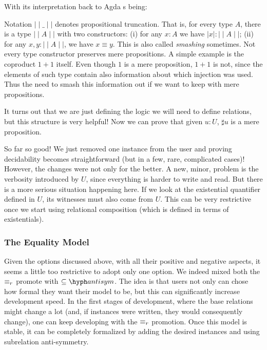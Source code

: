   
  With its interpretation back to Agda s being:
   
  
  Notation $\mid\mid\_\mid\mid$ denotes propositional truncation. That is, for every type $A$,
  there is a type $\mid\mid A \mid\mid$ with two constructors: (i) for any $x : A$ we have
  $\mid x \mid : \mid\mid A \mid\mid$; (ii) for any $x , y : \mid\mid A \mid\mid$, we have
  $x \equiv y$. This is also called \emph{smashing} sometimes. Not every type constructor 
  preserves mere propositions. A simple example is the coproduct
  $1 + 1$ itself. Even though $1$ is a mere proposition, $1 + 1$ is not, since the elements of such type
  contain also information about which injection was used. Thus the need to smash this information out
  if we want to keep with mere propositions.
  
  It turns out that we are just defining the logic we will need to define relations, but this
  structure is very helpful! Now we can prove that given $u : U$, $\sharp u$ is a mere proposition.
  
  
  So far so good! We just removed one instance from the user and proving decidability becomes
  straightforward (but in a few, rare, complicated cases)! However, the changes were not only for the better.
  A new, minor, problem is the verbosity introduced by $U$, since everything is harder to write and read.
  But there is a more serious situation happening here. If we look at the existential quantifier defined in $U$,
  its witnesses must also come from $U$. This can be very restrictive once we start using relational
  composition (which is defined in terms of existentials).

\subsubsection{The Equality Model}
  
  Given the options discussed above, with all their positive and negative aspects, it seems
  a little too restrictive to adopt only one option. We indeed mixed both the $\equiv_r$ promote
  with $\subseteq\hyph antisym$. The idea is that users not only can chose how formal they want their model
  to be, but this can significantly increase development speed. In the first stages of development, where
  the base relations might change a lot (and, if instances were written, they would consequently change),
  one can keep developing with the $\equiv_r$ promotion. Once this model is stable, it can be completely
  formalized by adding the desired instances and using subrelation anti-symmetry.

